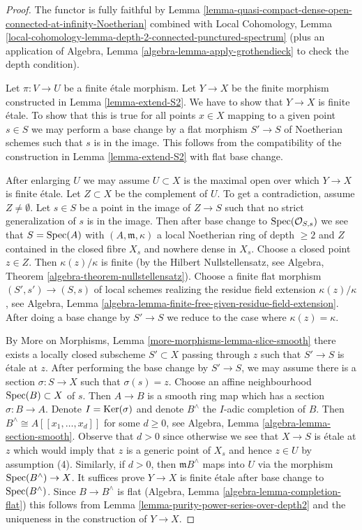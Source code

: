 \begin{proof}
The functor is fully faithful by
Lemma \ref{lemma-quasi-compact-dense-open-connected-at-infinity-Noetherian}
combined with Local Cohomology,
Lemma \ref{local-cohomology-lemma-depth-2-connected-punctured-spectrum}
(plus an application of
Algebra, Lemma \ref{algebra-lemma-apply-grothendieck}
to check the depth condition).

\medskip\noindent
Let $\pi : V \to U$ be a finite \'etale morphism. Let $Y \to X$
be the finite morphism constructed in Lemma \ref{lemma-extend-S2}.
We have to show that $Y \to X$ is finite \'etale.
To show that this is true for all points $x \in X$ mapping to a
given point $s \in S$ we may perform a base change by a flat
morphism $S' \to S$ of Noetherian schemes such that $s$ is
in the image. This follows from the compatibility of the
construction in Lemma \ref{lemma-extend-S2} with flat base change.

\medskip\noindent
After enlarging $U$ we may assume $U \subset X$ is
the maximal open over which $Y \to X$ is finite \'etale.
Let $Z \subset X$ be the complement of $U$.
To get a contradiction, assume $Z \not = \emptyset$.
Let $s \in S$ be a point in the image of $Z \to S$
such that no strict generalization of $s$ is in the image.
Then after base change to $\mathop{\mathrm{Spec}}(\mathcal{O}_{S, s})$
we see that $S = \mathop{\mathrm{Spec}}(A)$ with $(A, \mathfrak m, \kappa)$
a local Noetherian ring of depth $\geq 2$ and $Z$
contained in the closed fibre $X_s$
and nowhere dense in $X_s$. Choose a closed point $z \in Z$.
Then $\kappa(z)/\kappa$ is finite (by the Hilbert Nullstellensatz, see
Algebra, Theorem \ref{algebra-theorem-nullstellensatz}).
Choose a finite flat morphism $(S', s') \to (S, s)$ of local schemes
realizing the residue field extension $\kappa(z)/\kappa$, see
Algebra, Lemma \ref{algebra-lemma-finite-free-given-residue-field-extension}.
After doing a base change by $S' \to S$ we reduce to the case
where $\kappa(z) = \kappa$.

\medskip\noindent
By More on Morphisms, Lemma \ref{more-morphisms-lemma-slice-smooth}
there exists a locally closed subscheme $S' \subset X$ passing through $z$
such that $S' \to S$ is \'etale at $z$. After performing the base change
by $S' \to S$, we may assume there is a section $\sigma : S \to X$
such that $\sigma(s) = z$. Choose an affine neighbourhood
$\mathop{\mathrm{Spec}}(B) \subset X$ of $s$. Then $A \to B$ is a smooth ring
map which has a section $\sigma : B \to A$. Denote $I = \mathop{\mathrm{Ker}}(\sigma)$
and denote $B^\wedge$ the $I$-adic completion of $B$.
Then $B^\wedge \cong A[[x_1, \ldots, x_d]]$ for some $d \geq 0$, see
Algebra, Lemma \ref{algebra-lemma-section-smooth}.
Observe that $d > 0$ since otherwise we see that $X \to S$
is \'etale at $z$ which would imply that $z$ is a generic point of
$X_s$ and hence $z \in U$ by assumption (4).
Similarly, if $d > 0$, then $\mathfrak m B^\wedge$ maps into
$U$ via the morphism $\mathop{\mathrm{Spec}}(B^\wedge) \to X$.
It suffices prove $Y \to X$ is finite \'etale after base change
to $\mathop{\mathrm{Spec}}(B^\wedge)$. Since $B \to B^\wedge$ is flat
(Algebra, Lemma \ref{algebra-lemma-completion-flat})
this follows from Lemma \ref{lemma-purity-power-series-over-depth2}
and the uniqueness in the construction of $Y \to X$.
\end{proof}

